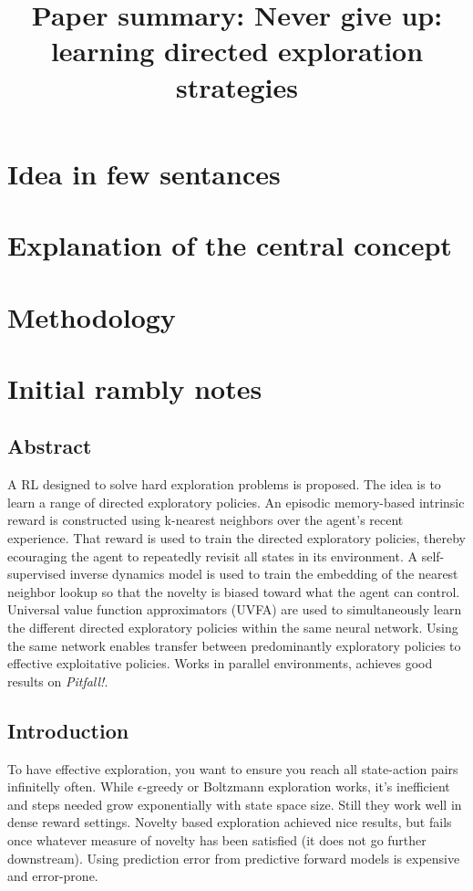 \documentclass{article}
\title{Paper summary: Never give up: learning directed exploration strategies}
\begin{document}
\maketitle


\section{Idea in few sentances}



\section{Explanation of the central concept}




\section{Methodology}


\section{Initial rambly notes}


\subsection{Abstract}
A RL designed to solve hard exploration problems is proposed.
The idea is to learn a range of directed exploratory policies. 
An episodic memory-based intrinsic reward is constructed using k-nearest neighbors over the agent's recent experience.
That reward is used to train the directed exploratory policies, thereby ecouraging the agent to
repeatedly revisit all states in its environment.
A self-supervised inverse dynamics model is used to train the embedding of the nearest neighbor lookup
so that the novelty is biased toward what the agent can control.
Universal value function approximators (UVFA) are used to simultaneously learn the different directed
exploratory policies within the same neural network.
Using the same network enables transfer between predominantly exploratory policies
to effective exploitative policies.
Works in parallel environments, achieves good results on \textit{Pitfall!}.


\subsection{Introduction}
To have effective exploration, you want to ensure you reach all state-action pairs infinitelly often.
While $ \epsilon  $-greedy or Boltzmann exploration works,
it's inefficient and steps needed grow exponentially with state space size.
Still they work well in dense reward settings.
Novelty based exploration achieved nice results, but fails once whatever measure of novelty has been satisfied (it does not go further downstream).
Using prediction error from predictive forward models is expensive and error-prone.
\end{document}
